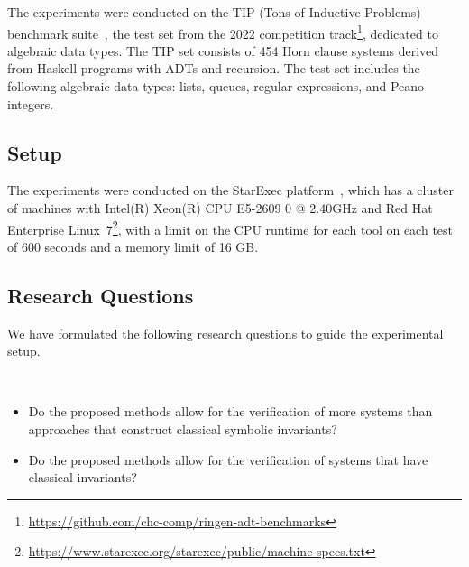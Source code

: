 The experiments were conducted on the TIP (Tons of Inductive Problems) benchmark suite~\cite{claessen2015tip}, the test set from the 2022 \chccomp{} competition track\footnote{\url{https://github.com/chc-comp/ringen-adt-benchmarks}}, dedicated to algebraic data types. The TIP set consists of 454 Horn clause systems derived from Haskell programs with ADTs and recursion. The test set includes the following algebraic data types: lists, queues, regular expressions, and Peano integers.

\subsection{Setup}
The experiments were conducted on the StarExec platform~\cite{stump2014starexec}, which has a cluster of machines with Intel(R) Xeon(R) CPU E5-2609 0 @ 2.40GHz and Red Hat Enterprise Linux~7\footnote{\url{https://www.starexec.org/starexec/public/machine-specs.txt}}, with a limit on the CPU runtime for each tool on each test of 600 seconds and a memory limit of 16 GB.

\subsection{Research Questions}

We have formulated the following research questions to guide the experimental setup.
\begin{resquest}\label{rq:conv}
$ $

\begin{itemize}
    \item Do the proposed methods allow for the verification of more systems than approaches that construct classical symbolic invariants?
    \item Do the proposed methods allow for the verification of systems that have classical invariants?

\end{itemize}
\end{resquest}

